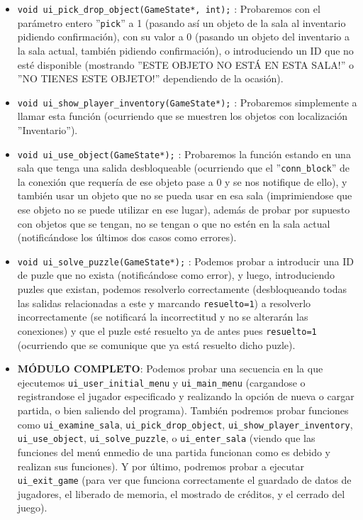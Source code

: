 \begin{itemize}
\begin{itemize}
			\item \verb|void ui_pick_drop_object(GameState*, int);| : Probaremos con el parámetro entero ''\verb|pick|'' a 1 (pasando así un objeto de la sala al inventario pidiendo confirmación), con su valor a 0 (pasando un objeto del inventario a la sala actual, también pidiendo confirmación), o introduciendo un ID que no esté disponible (mostrando ''ESTE OBJETO NO ESTÁ EN ESTA SALA!'' o ''NO TIENES ESTE OBJETO!'' dependiendo de la ocasión).
			\item \verb|void ui_show_player_inventory(GameState*);| : Probaremos simplemente a llamar esta función (ocurriendo que se muestren los objetos con localización ''Inventario'').
			\item \verb|void ui_use_object(GameState*);| : Probaremos la función estando en una sala que tenga una salida desbloqueable (ocurriendo que el ''\verb|conn_block|'' de la conexión que requería de ese objeto pase a 0 y se nos notifique de ello), y también usar un objeto que no se pueda usar en esa sala (imprimiendose que ese objeto no se puede utilizar en ese lugar), además de probar por supuesto con objetos que se tengan, no se tengan o que no estén en la sala actual (notificándose los últimos dos casos como errores).
			\item \verb|void ui_solve_puzzle(GameState*);| : Podemos probar a introducir una ID de puzle que no exista (notificándose como error), y luego, introduciendo puzles que existan, podemos resolverlo correctamente (desbloqueando todas las salidas relacionadas a este y marcando \verb|resuelto=1|) a resolverlo incorrectamente (se notificará la incorrectitud y no se alterarán las conexiones) y que el puzle esté resuelto ya de antes pues \verb|resuelto=1| (ocurriendo que se comunique que ya está resuelto dicho puzle).
			\\ \item \textbf{MÓDULO COMPLETO}: Podemos probar una secuencia en la que ejecutemos \verb|ui_user_initial_menu| y \verb|ui_main_menu| (cargandose o registrandose el jugador especificado y realizando la opción de nueva o cargar partida, o bien saliendo del programa). También podremos probar funciones como \verb|ui_examine_sala|, \verb|ui_pick_drop_object|, \verb|ui_show_player_inventory|, \verb|ui_use_object|, \verb|ui_solve_puzzle|, o \verb|ui_enter_sala| (viendo que las funciones del menú enmedio de una partida funcionan como es debido y realizan sus funciones). Y por último, podremos probar a ejecutar \verb|ui_exit_game| (para ver que funciona correctamente el guardado de datos de jugadores, el liberado de memoria, el mostrado de créditos, y el cerrado del juego).
		\end{itemize}


\end{itemize}
